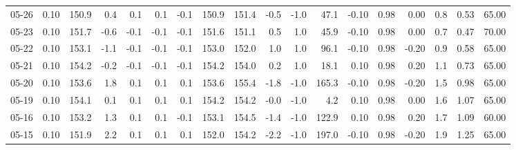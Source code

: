 \begin{threeparttable}
{\begin{tabular}{lrrrrrrrrrrrrrrrrr}
  05-26 &     0.10 & 150.9 &               0.4 &               0.1 &                0.1 &               -0.1 & 150.9 & 151.4 &       -0.5 &                     -1.0 &                47.1 &      -0.10 &      0.98 &           0.00 &              0.8 &            0.53 &                  65.00 \\
  05-23 &     0.10 & 151.7 &              -0.6 &              -0.1 &               -0.1 &               -0.1 & 151.6 & 151.1 &        0.5 &                      1.0 &                45.9 &      -0.10 &      0.98 &           0.00 &              0.7 &            0.47 &                  70.00 \\
  05-22 &     0.10 & 153.1 &              -1.1 &              -0.1 &               -0.1 &               -0.1 & 153.0 & 152.0 &        1.0 &                      1.0 &                96.1 &      -0.10 &      0.98 &          -0.20 &              0.9 &            0.58 &                  65.00 \\
  05-21 &     0.10 & 154.2 &              -0.2 &              -0.1 &               -0.1 &               -0.1 & 154.2 & 154.0 &        0.2 &                      1.0 &                18.1 &       0.10 &      0.98 &           0.20 &              1.1 &            0.73 &                  65.00 \\
  05-20 &     0.10 & 153.6 &               1.8 &               0.1 &                0.1 &                0.1 & 153.6 & 155.4 &       -1.8 &                     -1.0 &               165.3 &      -0.10 &      0.98 &          -0.20 &              1.5 &            0.98 &                  65.00 \\
  05-19 &     0.10 & 154.1 &               0.1 &               0.1 &                0.1 &                0.1 & 154.2 & 154.2 &       -0.0 &                     -1.0 &                 4.2 &       0.10 &      0.98 &           0.00 &              1.6 &            1.07 &                  65.00 \\
  05-16 &     0.10 & 153.2 &               1.3 &               0.1 &                0.1 &               -0.1 & 153.1 & 154.5 &       -1.4 &                     -1.0 &               122.9 &       0.10 &      0.98 &           0.20 &              1.7 &            1.09 &                  60.00 \\
  05-15 &     0.10 & 151.9 &               2.2 &               0.1 &                0.1 &                0.1 & 152.0 & 154.2 &       -2.2 &                     -1.0 &               197.0 &      -0.10 &      0.98 &          -0.20 &              1.9 &            1.25 &                  65.00 \\

\end{tabular}}
\end{threeparttable}
